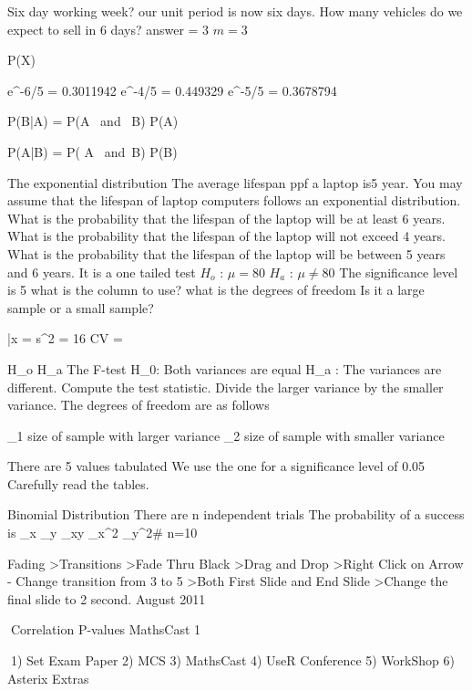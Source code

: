 Six day working week?
our unit period is now six days.
How many vehicles do we expect to sell in 6 days?
answer = 3
$m=3$

P(X)

e^{-6/5} = 0.3011942
e^{-4/5} = 0.449329
e^{-5/5} = 0.3678794

P(B|A) = { P(A \mbox{ and } B) \over P(A) }
 
P(A|B) = { P( A \mbox{ and }B) \over P(B) }

The exponential distribution
The average lifespan ppf a laptop is5 year. You may assume that the lifespan of laptop computers follows an exponential distribution.
What is the probability that the lifespan of the laptop will be at least 6 years.
What is the probability that the lifespan of the laptop will not exceed 4 years.
What is the probability that the lifespan of the laptop will be between 5 years and 6 years.
It is a one tailed test
$H_o$  : $\mu = 80 $
$H_a$  : $\mu \neq 80$
The significance level is 5%
what is the column to use?
what is the degrees of freedom
Is it a large sample or a small sample?

\bar{x} =
s^2 = 16
CV =




H_o
H_a
The F-test
H_0: Both variances are equal
H_a : The variances are different.
Compute the test statistic.
Divide the larger variance by the smaller variance.
The degrees of freedom are as follows
 
\nu_1 size of sample with larger variance
\nu_2 size of sample with smaller variance

There are 5 values tabulated
We use the one for a significance level of 0.05
Carefully read the tables.

Binomial Distribution
There are n independent trials
The probability of a success is
\sum_x
\sum_y
\sum_xy
\sum_x^2
\sum_y^2#
n=10

Fading
>Transitions
>Fade Thru Black
>Drag and Drop
>Right Click on Arrow - Change transition from 3 to 5
>Both First Slide and End Slide
>Change the final slide to 2 second.
August 2011

Correlation
P-values
MathsCast 1

1) Set Exam Paper
2) MCS
3) MathsCast
4) UseR Conference
5) WorkShop
6) Asterix Extras


